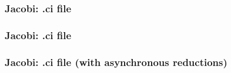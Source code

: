 \begin{frame}[fragile]
  \frametitle{Jacobi: .ci file}
  
\end{frame}

\begin{frame}[fragile]
  \frametitle{Jacobi: .ci file}
  
\end{frame}

\begin{frame}[fragile]
  \frametitle{Jacobi: .ci file (with \textbf{asynchronous} reductions)}
  
\end{frame}

%   

%   

%   

%   

%   
